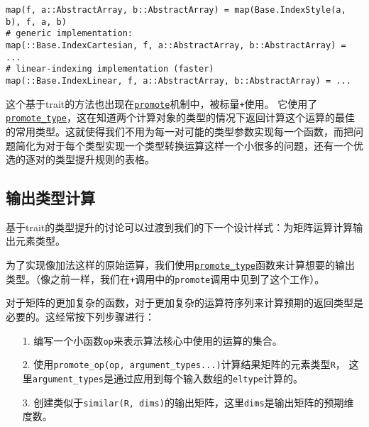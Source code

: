 \begin{verbatim}
map(f, a::AbstractArray, b::AbstractArray) = map(Base.IndexStyle(a, b), f, a, b)
# generic implementation:
map(::Base.IndexCartesian, f, a::AbstractArray, b::AbstractArray) = ...
# linear-indexing implementation (faster)
map(::Base.IndexLinear, f, a::AbstractArray, b::AbstractArray) = ...
\end{verbatim}



这个基于trait的方法也出现在\hyperlink{1760874576431605095}{\texttt{promote}}机制中，被标量\texttt{+}使用。 它使用了\hyperlink{15048881762587391286}{\texttt{promote\_type}}，这在知道两个计算对象的类型的情况下返回计算这个运算的最佳的常用类型。这就使得我们不用为每一对可能的类型参数实现每一个函数，而把问题简化为对于每个类型实现一个类型转换运算这样一个小很多的问题，还有一个优选的逐对的类型提升规则的表格。



\hypertarget{8273619992944815153}{}


\subsection{输出类型计算}



基于trait的类型提升的讨论可以过渡到我们的下一个设计样式：为矩阵运算计算输出元素类型。



为了实现像加法这样的原始运算，我们使用\hyperlink{15048881762587391286}{\texttt{promote\_type}}函数来计算想要的输出类型。（像之前一样，我们在\texttt{+}调用中的\texttt{promote}调用中见到了这个工作）。



对于矩阵的更加复杂的函数，对于更加复杂的运算符序列来计算预期的返回类型是必要的。这经常按下列步骤进行：



\begin{itemize}
\item[1. ] 编写一个小函数\texttt{op}来表示算法核心中使用的运算的集合。


\item[2. ] 使用\texttt{promote\_op(op, argument\_types...)}计算结果矩阵的元素类型\texttt{R}， 这里\texttt{argument\_types}是通过应用到每个输入数组的\texttt{eltype}计算的。


\item[3. ] 创建类似于\texttt{similar(R, dims)}的输出矩阵，这里\texttt{dims}是输出矩阵的预期维度数。

\end{itemize}


